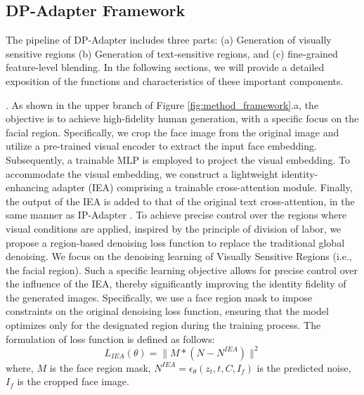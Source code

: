 \subsection{DP-Adapter Framework}

The pipeline of DP-Adapter includes three parts: (a) Generation of visually sensitive regions
(b) Generation of text-sensitive regions, and (c) fine-grained feature-level blending.  In the following sections, we will provide a detailed exposition of the functions and characteristics of these important components.




. As shown in the upper branch of Figure \ref{fig:method_framework}.a, the objective is to achieve high-fidelity human generation, with a specific focus on the facial region. Specifically, we crop the face image from the original image and utilize a pre-trained visual encoder to extract the input face embedding. Subsequently, a trainable MLP is employed to project the visual embedding. To accommodate the visual embedding, we construct a lightweight identity-enhancing adapter (IEA) comprising a trainable cross-attention module. Finally, the output of the IEA is added to that of the original text cross-attention, in the same manner as IP-Adapter \cite{ye2023ip}. To achieve precise control over the regions where visual conditions are applied, inspired by the principle of division of labor, we propose a region-based denoising loss function to replace the traditional global denoising. We focus on the denoising learning of Visually Sensitive Regions (i.e., the facial region). Such a specific learning objective allows for precise control over the influence of the IEA, thereby significantly improving the identity fidelity of the generated images. Specifically, we use a face region mask to impose constraints on the original denoising loss function, ensuring that the model optimizes only for the designated region during the training process. The formulation of loss function is defined as follows:
\begin{equation}
    L_{IEA}(\theta) = \lVert M * (N - N^{IEA})\rVert^2 
    \label{eq:IEA}
\end{equation}
where, $M$ is the face region mask, $N^{IEA} = \epsilon_\theta(z_t, t, C, I_f)$ is the predicted noise, $I_f$ is the cropped face image.

